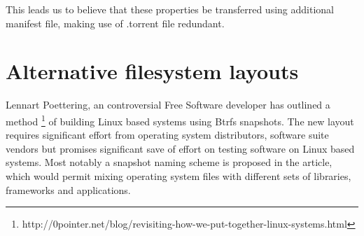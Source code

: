 \documentclass[a4paper,11pt]{kth-mag}
\begin{document}
This leads us to believe that these properties be transferred
using additional manifest file, making use of .torrent file redundant.

\section{Alternative filesystem layouts}

Lennart Poettering, an controversial Free Software developer has outlined a method
\footnote{http://0pointer.net/blog/revisiting-how-we-put-together-linux-systems.html}
of building Linux based systems using Btrfs snapshots.
The new layout requires significant effort from operating system distributors,
software suite vendors but promises significant save of effort on testing
software on Linux based systems.
Most notably a snapshot naming scheme is proposed in the article,
which would permit mixing operating system files with different
sets of libraries, frameworks and applications.


%
%
%
%

\appendix


\clearpage
\twocolumn
\printglossaries
\clearpage
\onecolumn
\end{document}
